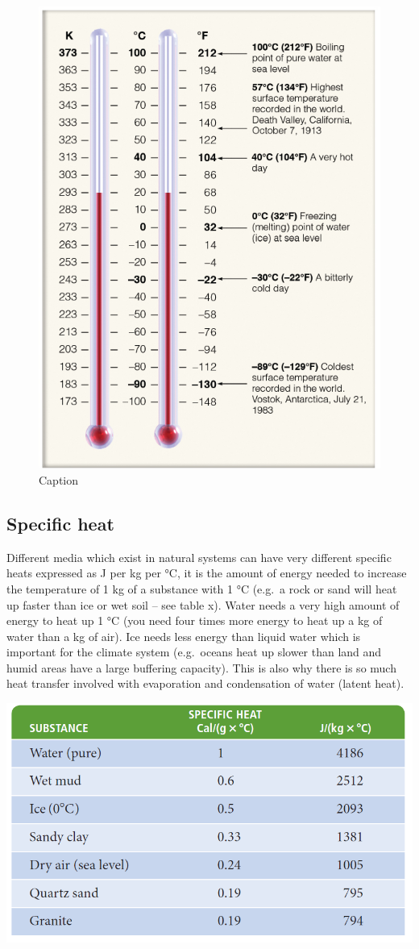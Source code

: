 \documentclass[oneside]{book}
\begin{document}
\begin{figure}

{\centering \includegraphics[width=0.5\linewidth]{figures/Figure115} 

}

\caption{Caption}\label{fig:Temperature2}
\end{figure}

\subsection{Specific heat}\label{specific-heat}

Different media which exist in natural systems can have very different
specific heats expressed as J per kg per °C, it is the amount of energy
needed to increase the temperature of 1 kg of a substance with 1 °C
(e.g.~a rock or sand will heat up faster than ice or wet soil -- see
table x). Water needs a very high amount of energy to heat up 1 °C (you
need four times more energy to heat up a kg of water than a kg of air).
Ice needs less energy than liquid water which is important for the
climate system (e.g.~oceans heat up slower than land and humid areas
have a large buffering capacity). This is also why there is so much heat
transfer involved with evaporation and condensation of water (latent
heat).

\begin{center}
\label{table:Sheat}

\begin{center}\includegraphics[width=0.8\linewidth]{figures/Table12} \end{center}
\end{center}
\end{document}

